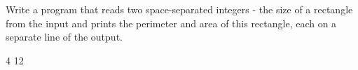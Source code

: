 




Write a program that reads two space-separated integers - the size of a rectangle from the input and prints
the perimeter and area of this rectangle, each on a separate line of the output.

 4
12
\koniec

